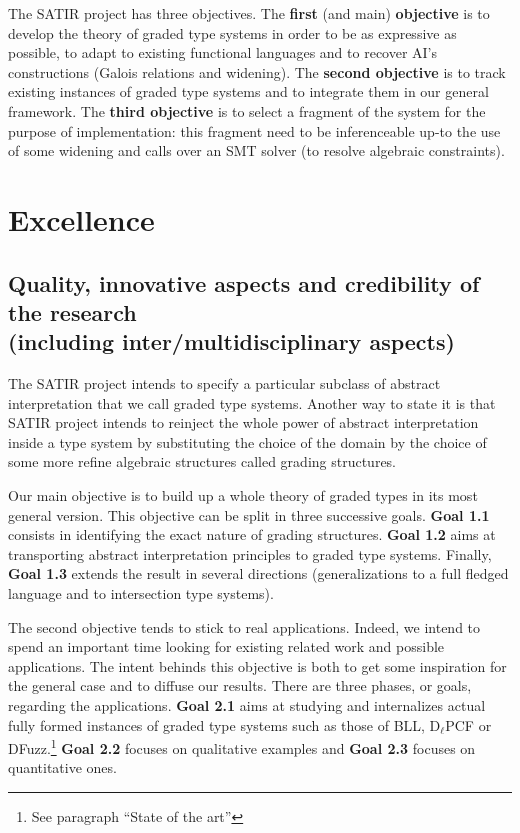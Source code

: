 \documentclass{article}[11pt]
\newcommand\BLL{BLL\xspace}
\newcommand\DlPCF{D$_\ell$PCF\xspace}
\newcommand\DFuzz{DFuzz\xspace}
\begin{document}
The SATIR project has three objectives. The {\bf first} (and main) {\bf objective} is to develop the theory of graded type systems in order to be as expressive as possible, to adapt to existing functional languages and to recover AI's constructions (Galois relations and widening). The {\bf second objective} is to track existing instances of graded type systems and to integrate them in our general framework. The {\bf third objective} is to select a fragment of the system for the purpose of implementation: this fragment need to be inferenceable up-to the use of some widening and calls over an SMT solver (to resolve algebraic constraints).




\section{Excellence}
\subsection{Quality, innovative aspects and credibility of the research\\  (including inter/multidisciplinary aspects)}

The SATIR project intends to specify a particular subclass of abstract interpretation that we call graded type systems. Another way to state it is that SATIR project intends to reinject the whole power of abstract interpretation inside a type system by substituting the choice of the domain by the choice of some more refine algebraic structures called grading structures.

 Our main objective is to build up a whole theory of graded types in its most general version. This objective can be split in three successive goals. {\bf Goal 1.1} consists in identifying the exact nature of grading structures. {\bf Goal 1.2} aims at transporting abstract interpretation principles to graded type systems. Finally, {\bf Goal 1.3} extends the result in several directions (generalizations to a full fledged language and to intersection type systems).

 The second objective tends to stick to real applications. Indeed, we intend to spend an important time looking for existing related work and possible applications. The intent behinds this objective is both to get some inspiration for the general case and to diffuse our results. There are three phases, or goals, regarding the applications. {\bf Goal 2.1} aims at studying and internalizes actual fully formed instances of graded type systems such as those of \BLL, \DlPCF or \DFuzz.\footnote{See paragraph ``State of the art''} {\bf Goal 2.2} focuses on qualitative examples and {\bf Goal 2.3} focuses on quantitative ones.
\end{document}

